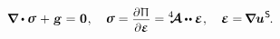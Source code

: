 \noindent
{}

\nopagebreak\vspace{-1.2em}
\begin{equation}
\label{lineartheory:wholesetofequations}
\boldnabla \dotp \linearstress \hspace{.15ex} + \hspace{.15ex} \volumeloadvector
\hspace{.1ex} = \hspace{.1ex}
\zerovector
\hspace{.1ex} ,
\hspace{1em}
%
\linearstress = \scalebox{.92}{$
   \displaystyle
   \frac{ \raisemath{-0.133em}{
      \partial \hspace{.1ex} \potentialenergydensity^{\mathstrut}
   }%
   }%
   { \raisemath{-0.07em}{\partial \infinitesimaldeformation} }
$}
=
\stiffnesstensor
\hspace{-0.1ex} \dotdotp
\infinitesimaldeformation
\hspace{.1ex} ,
\hspace{1em}
%
\infinitesimaldeformation
= \hspace{-0.2ex}
\boldnabla {\bm{u}}^{\hspace{.1ex}\mathsf{S}}
\hspace{-0.2ex} .
\end{equation}

